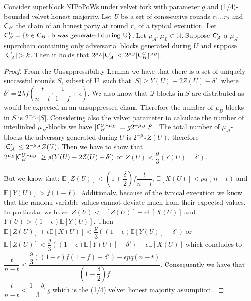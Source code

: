 \begin{lemma}
   Consider superblock NIPoPoWs under velvet fork with parameter $g$ and (1/4)-bounded velvet honest majority. Let $U$ be a set of consecutive rounds $r_1 ... r_2$ and $\mathsf{C}_B$ the chain of an honest party at round $r_2$ of a typical execution. Let $\mathsf{C}_B^U = \{b \in \mathsf{C}_B: \text{b was generated during U} \}$. Let $\mu_\mathcal{A}, \mu_B \in \mathbb{N}$. Suppose $\mathsf{C}'_\mathcal{A}$ a $\mu_\mathcal{A}$ superchain containing only adversarial blocks generated during $U$ and suppose $\vert \mathsf{C}'_\mathcal{A} \vert > k$. Then it holds that $ 2^{\mu_\mathcal{A}}\lvert \mathsf{C}'_\mathcal{A} \rvert < 2^{\mu_B}\lvert \mathsf{C}_B^U\negthickspace\uparrow^{\mu_B} \rvert $.
\end{lemma}
\begin{proof} From the Unsuppressibility Lemma we have that there is a set of uniquely successful rounds $S$, subset of U, such that $\lvert S \rvert \geq Y(U) - 2Z(U) - \delta'$, where $\delta' = 2 \lambda f (\dfrac{t}{n-t} \cdot \dfrac{1}{1-f} + \epsilon)$. We also know that $\mathcal{Q}$-blocks in $S$ are distributed as would be expected in an unsuppressed chain. Therefore the number of $\mu_B$-blocks in $S$ is $2^{-\mu_B} \lvert S \rvert$. Considering also the velvet parameter to calculate the number of interlinked $\mu_B$-blocks we have $\lvert \mathsf{C}_B^U\negthickspace\uparrow^{\mu_B} \rvert = g2^{-\mu_B} \lvert S \rvert$.  The total number of $\mu_\mathcal{A}$-blocks the adversary generated during $U$ is $2^{-\mu_\mathcal{A}}Z(U)$, therefore $\lvert \mathsf{C}'_\mathcal{A} \rvert \leq 2^{-\mu_\mathcal{A}}Z(U)$. Then we have to show that $2^{\mu_B}\lvert \mathsf{C}_B^U\negthickspace\uparrow^{\mu_B} \rvert \geq g ( Y(U) - 2Z(U) - \delta' ) $ or $Z(U) < \dfrac{g}{3}(Y(U) - \delta')$.

But we know that\cite{backbone}: $\mathbb{E}[Z(U)] < (1+\dfrac{\delta}{2})f\dfrac{t}{n-t}$, $\mathbb{E}[X(U)] < pq(n-t)$ and $\mathbb{E}[Y(U)] > f(1-f)$. Additionaly, because of the typical execution we know that the random variable values cannot deviate much from their expected values. In particular we have\cite{backbone}: $Z(U) < \mathbb{E}[Z(U)] + \epsilon \mathbb{E}[X(U)]$ and $Y(U) > (1-\epsilon)\mathbb{E}[Y(U)]$. Then $\mathbb{E}[Z(U)] + \epsilon\mathbb{E}[X(U)] < \dfrac{g}{3}( (1-\epsilon)\mathbb{E}[Y(U)] -\delta')$ or $\mathbb{E}[Z(U)]  < \dfrac{g}{3}( (1-\epsilon)\mathbb{E}[Y(U)] -\delta') - \epsilon\mathbb{E}[X(U)]$ which concludes to $\dfrac{t}{n-t} < \dfrac{\dfrac{g}{3}((1-\epsilon)f(1-f)-\delta') - \epsilon pq(n-t)}{(1-\dfrac{\delta}{2})f}$. Consequently we have that $\dfrac{t}{n-t} < \dfrac{1-\delta_v}{3}g$ which is the (1/4) velvet honest majority assumption.
\label{lem:claim3_lemma}
\end{proof}